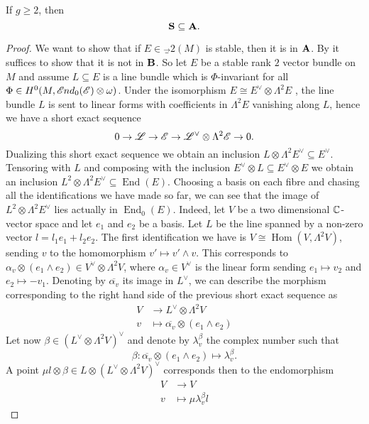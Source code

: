 \documentclass[A4paper, 12pt, british, reqno]{amsart}
\DeclareMathOperator{\Hom}{Hom}
\DeclareMathOperator{\End}{End}
\newcommand{\ot}{\otimes}
\newcommand{\dual}{^{\vee}}
\begin{document}
\begin{lm}
    If $g\geqslant 2$, then
    \[ \mathbf{S}\subseteq \mathbf{A}. \]
    \begin{proof}
	We want to show that if $E\in \Vec_{2}(M)$ is stable, then it is in $\mathbf{A}$.
	By  it suffices to show that it is not in $\mathbf{B}$.
	So let $E$ be a stable rank $2$ vector bundle on $M$ and assume $L\subseteq E$ is a line bundle which is $\Phi$-invariant for all $\Phi\in H^{0}(M,\sEnd_{0}(\E)\ot \w)$.
	Under the isomorphism $E\cong E\dual \ot \Lambda^{2}E$ \cite[Exercise II.5.16]{har77}, the line bundle $L$ is sent to linear forms with coefficients in $\Lambda^{2}E$ vanishing along $L$, hence we have a short exact sequence
	\[ 0\to \L\to \E\to \L\dual \ot \Lambda^{2}\E\to 0. \]
	Dualizing this short exact sequence we obtain an inclusion $L\ot \Lambda^{2}E\dual \subseteq E\dual$.
	Tensoring with $L$ and composing with the inclusion $E\dual\ot L\subseteq E\dual \ot E$ we obtain an inclusion $L^{2}\ot \Lambda^{2}E\dual \subseteq \End(E)$.
	Choosing a basis on each fibre and chasing all the identifications we have made so far, we can see that the image of $L^{2}\ot \Lambda^{2}E\dual$ lies actually in $\End_{0}(E)$.
	Indeed, let $V$ be a two dimensional $\mathbb{C}$-vector space and let $e_{1}$ and $e_{2}$ be a basis.
	Let $L$ be the line spanned by a non-zero vector $l=l_{1}e_{1}+l_{2}e_{2}$.
	The first identification we have is $V\cong \Hom(V,\Lambda^{2}V)$, sending $v$ to the homomorphism $v'\mapsto v'\wedge v$.
	This corresponds to $\alpha_{v}\ot (e_{1}\wedge e_{2})\in V\dual\ot\Lambda^{2}V$, where $\alpha_{v}\in V\dual$ is the linear form sending $e_{1}\mapsto v_{2}$ and $e_{2}\mapsto -v_{1}$.
	Denoting by $\overline{\alpha_{v}}$ its image in $L\dual$, we can describe the morphism corresponding to the right hand side of the previous short exact sequence as
	\begin{align*}
	    V &\longrightarrow L\dual \ot \Lambda^{2}V \\
	    v &\longmapsto \overline{\alpha_{v}}\ot (e_{1}\wedge e_{2})
	\end{align*}
	Let now $\beta\in (L\dual \ot \Lambda^{2}V)\dual$ and denote by $\lambda_{v}^{\beta}$ the complex number such that
	\[ \beta\colon \overline{\alpha_{v}}\ot (e_{1}\wedge e_{2})\mapsto \lambda_{v}^{\beta}. \]
	A point $\mu l\ot \beta\in L\ot (L\dual\ot \Lambda^{2}V)\dual$ corresponds then to the endomorphism
	\begin{align*}
	    V &\longrightarrow V \\
	    v &\longmapsto \mu \lambda_{v}^{\beta}l

\end{align*}
\end{proof}
\end{lm}
\end{document}
